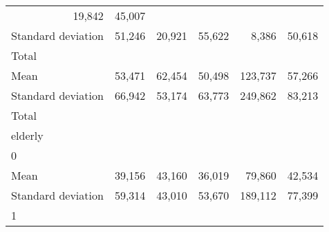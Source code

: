 \begin{tabular}{llllll}
  \multicolumn{1}{r}{19,842} &
  \multicolumn{1}{r}{45,007} \\
\multicolumn{1}{l}{\hspace{4em}Standard deviation} &
  \multicolumn{1}{|r}{51,246} &
  \multicolumn{1}{r}{20,921} &
  \multicolumn{1}{r}{55,622} &
  \multicolumn{1}{r}{8,386} &
  \multicolumn{1}{r}{50,618} \\
\multicolumn{1}{l}{\hspace{3em}Total} &
  \multicolumn{1}{|r}{} &
  \multicolumn{1}{r}{} &
  \multicolumn{1}{r}{} &
  \multicolumn{1}{r}{} &
  \multicolumn{1}{r}{} \\
\multicolumn{1}{l}{\hspace{4em}Mean} &
  \multicolumn{1}{|r}{53,471} &
  \multicolumn{1}{r}{62,454} &
  \multicolumn{1}{r}{50,498} &
  \multicolumn{1}{r}{123,737} &
  \multicolumn{1}{r}{57,266} \\
\multicolumn{1}{l}{\hspace{4em}Standard deviation} &
  \multicolumn{1}{|r}{66,942} &
  \multicolumn{1}{r}{53,174} &
  \multicolumn{1}{r}{63,773} &
  \multicolumn{1}{r}{249,862} &
  \multicolumn{1}{r}{83,213} \\
\multicolumn{1}{l}{\hspace{1em}Total} &
  \multicolumn{1}{|r}{} &
  \multicolumn{1}{r}{} &
  \multicolumn{1}{r}{} &
  \multicolumn{1}{r}{} &
  \multicolumn{1}{r}{} \\
\multicolumn{1}{l}{\hspace{2em}elderly} &
  \multicolumn{1}{|r}{} &
  \multicolumn{1}{r}{} &
  \multicolumn{1}{r}{} &
  \multicolumn{1}{r}{} &
  \multicolumn{1}{r}{} \\
\multicolumn{1}{l}{\hspace{3em}0} &
  \multicolumn{1}{|r}{} &
  \multicolumn{1}{r}{} &
  \multicolumn{1}{r}{} &
  \multicolumn{1}{r}{} &
  \multicolumn{1}{r}{} \\
\multicolumn{1}{l}{\hspace{4em}Mean} &
  \multicolumn{1}{|r}{39,156} &
  \multicolumn{1}{r}{43,160} &
  \multicolumn{1}{r}{36,019} &
  \multicolumn{1}{r}{79,860} &
  \multicolumn{1}{r}{42,534} \\
\multicolumn{1}{l}{\hspace{4em}Standard deviation} &
  \multicolumn{1}{|r}{59,314} &
  \multicolumn{1}{r}{43,010} &
  \multicolumn{1}{r}{53,670} &
  \multicolumn{1}{r}{189,112} &
  \multicolumn{1}{r}{77,399} \\
\multicolumn{1}{l}{\hspace{3em}1} &
  \multicolumn{1}{|r}{} &

\end{tabular}
